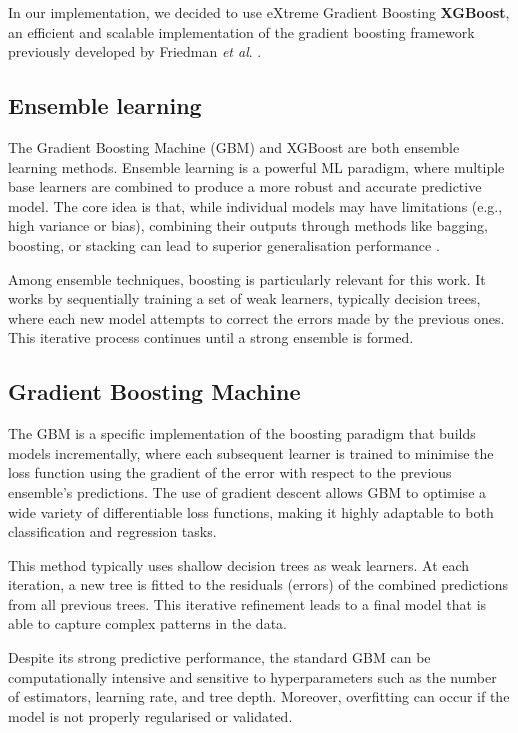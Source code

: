 \documentclass[12pt, a4paper]{report}
\begin{document}
In our implementation, we decided to use eXtreme Gradient Boosting \textbf{XGBoost}, an efficient and scalable  implementation of the gradient boosting framework previously developed by Friedman \textit{et al}. \cite{Friedman2000, Friedman2001}.

\subsection{Ensemble learning}

The Gradient Boosting Machine (GBM) and XGBoost are both ensemble learning methods.
Ensemble learning is a powerful ML paradigm, where multiple base learners are combined to produce a more robust and accurate predictive model. The core idea is that, while individual models may have limitations (e.g., high variance or bias), combining their outputs through methods like bagging, boosting, or stacking can lead to superior generalisation performance \cite{Mienye2022}.

Among ensemble techniques, boosting is particularly relevant for this work. It works by sequentially training a set of weak learners, typically decision trees, where each new model attempts to correct the errors made by the previous ones. This iterative process continues until a strong ensemble is formed.

\subsection{Gradient Boosting Machine}
The GBM is a specific implementation of the boosting paradigm that builds models incrementally, where each subsequent learner is trained to minimise the loss function using the gradient of the error with respect to the previous ensemble’s predictions. The use of gradient descent allows GBM to optimise a wide variety of differentiable loss functions, making it highly adaptable to both classification and regression tasks.

This method typically uses shallow decision trees as weak learners. At each iteration, a new tree is fitted to the residuals (errors) of the combined predictions from all previous trees. This iterative refinement leads to a final model that is able to capture complex patterns in the data.

Despite its strong predictive performance, the standard GBM can be computationally intensive and sensitive to hyperparameters such as the number of estimators, learning rate, and tree depth. Moreover, overfitting can occur if the model is not properly regularised or validated.
\end{document}
